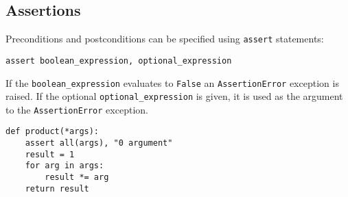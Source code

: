 \subsection{Assertions}

Preconditions and postconditions can be specified using \verb|assert| statements:
\begin{tcolorbox}
\begin{verbatim}
assert boolean_expression, optional_expression
\end{verbatim}
\end{tcolorbox}



If the \verb|boolean_expression| evaluates to \verb|False| an \verb|AssertionError| exception is raised.
If the optional \verb|optional_expression| is given, it is used as the argument to the \verb|AssertionError| exception.


\begin{lstlisting}
def product(*args):
    assert all(args), "0 argument"
    result = 1
    for arg in args:
        result *= arg
    return result

\end{lstlisting}

